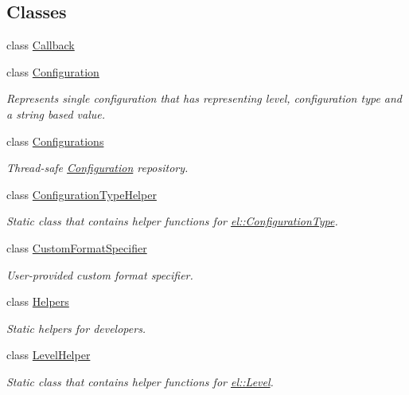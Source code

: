 \subsection*{Classes}
\begin{DoxyCompactItemize}
\item 
class \hyperlink{classel_1_1Callback}{Callback}
\item 
class \hyperlink{classel_1_1Configuration}{Configuration}
\begin{DoxyCompactList}\small\item\em Represents single configuration that has representing level, configuration type and a string based value. \end{DoxyCompactList}\item 
class \hyperlink{classel_1_1Configurations}{Configurations}
\begin{DoxyCompactList}\small\item\em Thread-\/safe \hyperlink{classel_1_1Configuration}{Configuration} repository. \end{DoxyCompactList}\item 
class \hyperlink{classel_1_1ConfigurationTypeHelper}{Configuration\+Type\+Helper}
\begin{DoxyCompactList}\small\item\em Static class that contains helper functions for \hyperlink{namespaceel_a281f5db6d6163678bc68a8b23b59e124}{el\+::\+Configuration\+Type}. \end{DoxyCompactList}\item 
class \hyperlink{classel_1_1CustomFormatSpecifier}{Custom\+Format\+Specifier}
\begin{DoxyCompactList}\small\item\em User-\/provided custom format specifier. \end{DoxyCompactList}\item 
class \hyperlink{classel_1_1Helpers}{Helpers}
\begin{DoxyCompactList}\small\item\em Static helpers for developers. \end{DoxyCompactList}\item 
class \hyperlink{classel_1_1LevelHelper}{Level\+Helper}
\begin{DoxyCompactList}\small\item\em Static class that contains helper functions for \hyperlink{namespaceel_ab0ac6091262344c52dd2d3ad099e8e36}{el\+::\+Level}. \end{DoxyCompactList}\item 

\end{DoxyCompactItemize}
